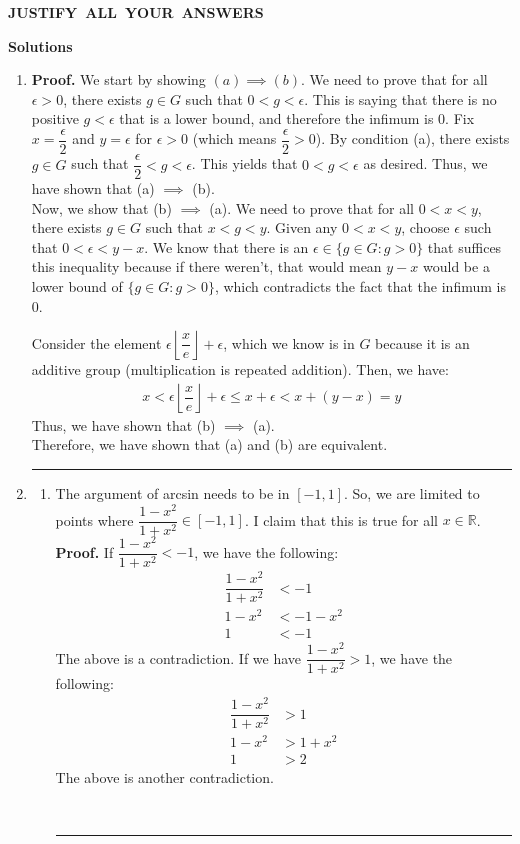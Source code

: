 \documentclass{article}%
\newenvironment{proof}[1][Proof]{\textbf{#1.} }{\ \rule{0.5em}{0.5em}}
\begin{document}
\begin{center}
\textbf{JUSTIFY\ ALL\ YOUR\ ANSWERS}

\textbf{Solutions}
\begin{enumerate}
    \item 
    \begin{proof}We start by showing $(a) \implies (b)$. We need to prove that for all $\epsilon >0$, there exists $g \in G$ such that $0 < g < \epsilon$. This is saying that there is no positive $g < \epsilon$ that is a lower bound, and therefore the infimum is 0. Fix $x = \dfrac{\epsilon}{2}$ and $y = \epsilon$ for $\epsilon > 0$ (which means $\dfrac{\epsilon}{2} >0$). By condition (a), there exists $g \in G$ such that $\dfrac{\epsilon}{2} < g < \epsilon$. This yields that $ 0 < g < \epsilon$ as desired. Thus, we have shown that (a) $\implies$ (b).
    $$$$
    Now, we show that (b) $\implies$ (a). We need to prove that for all $0 < x< y$, there exists $g \in G$ such that $x < g < y$. Given any $0 < x < y$, choose $\epsilon$ such that $0 < \epsilon < y-x$. We know that there is an $\epsilon \in \{g \in G : g > 0\}$ that suffices this inequality because if there weren't, that would mean $y-x$ would be a lower bound of $\{g \in G : g > 0\}$, which contradicts the fact that the infimum is 0. 

    Consider the element $\epsilon \left\lfloor \dfrac{x}{e} \right\rfloor + \epsilon$, which we know is in $G$ because it is an additive group (multiplication is repeated addition). Then, we have:
    \begin{align*}
        x < \epsilon \left\lfloor \dfrac{x}{e} \right\rfloor  + \epsilon \leq x + \epsilon < x + (y-x) = y
    \end{align*}
    Thus, we have shown that (b) $\implies$ (a).
    $$$$
    Therefore, we have shown that (a) and (b) are equivalent.
    \end{proof}
    \item \begin{enumerate}
        \item The argument of arcsin needs to be in $[-1, 1]$. So, we are limited to points where $\dfrac{1-x^2}{1+x^2} \in [-1, 1]$. I claim that this is true for all $x \in \mathbb{R}$. 
        \begin{proof}
        If $\dfrac{1-x^2}{1+x^2} < -1$, we have the following:
        \begin{align*}
            \dfrac{1-x^2}{1+x^2} &< -1 \\
            1 - x^2 &< -1 - x^2 \\
            1 &< -1
        \end{align*} The above is a contradiction.
        If we have $\dfrac{1-x^2}{1+x^2} > 1$, we have the following:
        \begin{align*}
            \dfrac{1-x^2}{1+x^2} &> 1 \\
            1 - x^2 &> 1 + x^2 \\
            1 &> 2
        \end{align*} The above is another contradiction. 


\end{proof}
\end{enumerate}
\end{enumerate}
\end{center}
\end{document}
